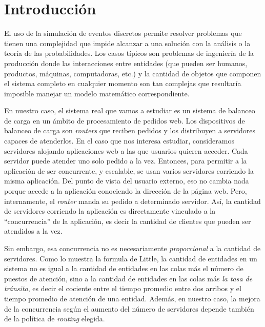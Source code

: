 \section{Introducción}

El uso de la simulación de eventos discretos permite resolver problemas que tienen una complejidad que impide alcanzar
a una solución con la análisis o la teoría de las probabilidades. Los casos típicos son problemas de ingeniería de la
producción donde las interacciones entre entidades (que pueden ser humanos, productos, máquinas, computadoras, etc.) y
la cantidad de objetos que componen el sistema completo en cualquier momento son tan complejas que resultaría imposible
manejar un modelo matemático correspondiente.

En nuestro caso, el sistema real que vamos a estudiar es un sistema de balanceo de carga en un ámbito de procesamiento
de pedidos web. Los dispositivos de balanceo de carga son \textit{routers} que reciben pedidos y los distribuyen a
servidores capaces de atenderlos. En el caso que nos interesa estudiar, consideramos servidores alojando aplicaciones
web a las que usuarios quieren acceder. Cada servidor puede atender uno solo pedido a la vez. Entonces, para permitir a
la aplicación de ser concurrente, y escalable, se usan varios servidores corriendo la misma aplicación. Del punto de
vista del usuario externo, eso no cambia nada porque accede a la aplicación conociendo la dirección de la página web.
Pero, internamente, el \textit{router} manda su pedido a determinado servidor. Así, la cantidad de servidores corriendo
la aplicación es directamente vinculado a la ``concurrencia'' de la aplicación, es decir la cantidad de clientes que
pueden ser atendidos a la vez.

Sin embargo, esa concurrencia no es necesariamente \emph{proporcional} a la cantidad de servidores. Como lo muestra la
formula de Little, la cantidad de entidades en un sistema no es igual a la cantidad de entidades en las colas más el
número de puestos de atención, sino a la cantidad de entidades en las colas más \emph{la tasa de tránsito}, es decir el
cociente entre el tiempo promedio entre dos arribos y el tiempo promedio de atención de una entidad. Además, en nuestro
caso, la mejora de la concurrencia según el aumento del número de servidores depende también de la política de
\textit{routing} elegida.

